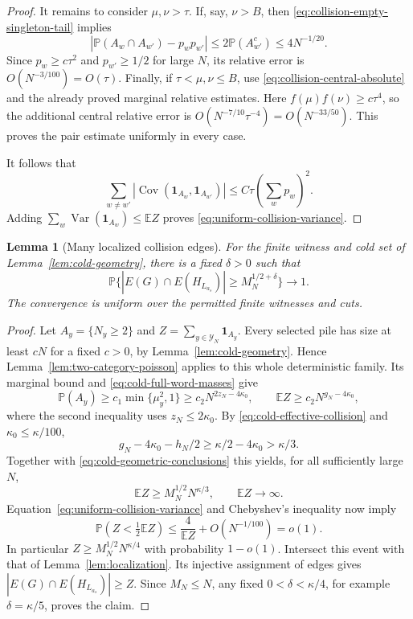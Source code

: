 \documentclass[11pt]{article}
\numberwithin{equation}{section}
\newtheorem{lemma}[lemma]{Lemma}
\newcommand{\E}{\mathbb E}
\newcommand{\Pp}{\mathbb P}
\newcommand{\Var}{\operatorname{Var}}
\newcommand{\1}{\mathbf 1}
\begin{document}
\begin{proof}
It remains to consider $\mu,\nu>\tau$. If, say, $\nu>B$, then
\eqref{eq:collision-empty-singleton-tail} implies
\[
 |\Pp(A_w\cap A_{w'})-p_wp_{w'}|
 \le2\Pp(A_{w'}^c)\le4N^{-1/20}.
\]
Since $p_w\ge c\tau^2$ and $p_{w'}\ge1/2$ for large $N$, its relative
error is $O(N^{-3/100})=O(\tau)$.
Finally, if $\tau<\mu,\nu\le B$, use
\eqref{eq:collision-central-absolute} and the already proved marginal
relative estimates. Here $f(\mu)f(\nu)\ge c\tau^4$, so the additional
central relative error is
$O(N^{-7/10}\tau^{-4})=O(N^{-33/50})$.
This proves the pair estimate uniformly in every case.

It follows that
\[
 \sum_{w\ne w'}|\operatorname{Cov}(\1_{A_w},\1_{A_{w'}})|
 \le C\tau\left(\sum_w p_w\right)^2.
\]
Adding $\sum_w\Var(\1_{A_w})\le\E Z$ proves
\eqref{eq:uniform-collision-variance}.
\end{proof}

\begin{lemma}[Many localized collision edges]
\label{lem:many-edges}
For the finite witness and cold set of Lemma~\ref{lem:cold-geometry},
there is a fixed $\delta>0$ such that
\[
 \Pp\{|E(G)\cap E(H_{L_{a_s}})|\ge M_N^{1/2+\delta}\}
 \longrightarrow1.
\]
The convergence is uniform over the permitted finite witnesses and cuts.
\end{lemma}

\begin{proof}
Let $A_y=\{N_y\ge2\}$ and $Z=\sum_{y\in\mathcal Y_N}\1_{A_y}$.
Every selected pile has size at least $cN$ for a fixed $c>0$, by
Lemma~\ref{lem:cold-geometry}. Hence
Lemma~\ref{lem:two-category-poisson} applies to this whole deterministic
family. Its marginal bound and \eqref{eq:cold-full-word-masses} give
\[
 \Pp(A_y)\ge c_1\min\{\mu_y^2,1\}
 \ge c_2N^{2z_N-4\kappa_0},\qquad
 \E Z\ge c_2N^{g_N-4\kappa_0},
\]
where the second inequality uses $z_N\le2\kappa_0$.
By \eqref{eq:cold-effective-collision} and $\kappa_0\le\kappa/100$,
\[
 g_N-4\kappa_0-h_N/2\ge\kappa/2-4\kappa_0>\kappa/3.
\]
Together with \eqref{eq:cold-geometric-conclusions} this yields, for all
sufficiently large $N$,
\[
 \E Z\ge M_N^{1/2}N^{\kappa/3},\qquad \E Z\longrightarrow\infty.
\]
Equation~\eqref{eq:uniform-collision-variance} and Chebyshev's inequality
now imply
\[
 \Pp(Z<\tfrac12\E Z)
 \le\frac4{\E Z}+O(N^{-1/100})=o(1).
\]
In particular $Z\ge M_N^{1/2}N^{\kappa/4}$ with probability $1-o(1)$.
Intersect this event with that of Lemma~\ref{lem:localization}. Its
injective assignment of edges gives
$|E(G)\cap E(H_{L_{a_s}})|\ge Z$. Since $M_N\le N$, any fixed
$0<\delta<\kappa/4$, for example $\delta=\kappa/5$, proves the claim.
\end{proof}
\end{document}
